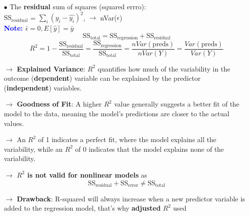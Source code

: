 \documentclass[letterpaper, 10.5pt,landscape]{article}
\begin{document}
\begin{multicols*}{3}
$\bullet$ The \textbf{residual} sum of squares (squared errro): \\ 
$\text{SS}_{\text{residual}}$ = \(\sum_{i} (y_{i} - \hat{y_{i}})^{2} \), $\rightarrow$ nVar($\epsilon$) \\

\vspace{2pt}
\textbf{\textcolor{blue}{Note: }} \(\bar{\epsilon} = 0, E[\hat{y}] = \bar{y} \)
\vspace{-3pt}
\[\text{SS}_{\text{total}} = \text{SS}_{\text{regression}} + \text{SS}_{\text{residual}} \]
\vspace{-3pt}
\[R^{2} = 1 - \frac{\text{SS}_{\text{residual}}}{\text{SS}_{\text{total}}} = \frac{\text{SS}_{\text{regression}}}{\text{SS}_{\text{total}}} = \frac{nVar(\text{preds})}{nVar(Y)} = \frac{Var(\text{preds})}{Var(Y)}\]
\vspace{-3pt}

$\rightarrow$  \textbf{Explained Variance}: $R^{2}$ quantifies how much of the variability in the outcome (\textbf{dependent}) variable can be explained by the predictor (\textbf{independent}) variables. 


$\rightarrow$ \textbf{Goodness of Fit}: A higher $R^{2}$
value generally suggests a better fit of the model to the data, meaning the model's predictions are closer to the actual values. 

$\rightarrow$ An $R^{2}$ of 1 indicates a perfect fit, where the model explains all the variability, while an $R^{2}$ of 0 indicates that the model explains none of the variability.

$\rightarrow$ \textbf{$R^{2}$ is not valid for nonlinear models} as 
\vspace{-2pt}
\[\boxed{\text{SS}_{\text{residual}} + \text{SS}_{\text{error}} \neq \text{SS}_{\text{total}}}\]
\vspace{-3pt}

$\rightarrow$ \textbf{Drawback}: R-squared will always increase when a new predictor variable is added to the regression model, that's why \textbf{adjusted} $R^{2}$ used










\end{multicols*}
\end{document}
